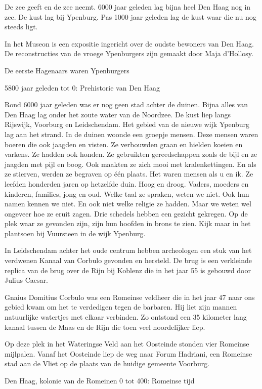 \documentclass[
  a4paper,
]{book}
\theoremstyle{definition}
\theoremstyle{definition}
\theoremstyle{definition}
\theoremstyle{definition}
\theoremstyle{remark}
\begin{document}
De zee geeft en de zee neemt. 6000 jaar geleden lag bijna heel Den Haag nog in zee. De kust lag bij Ypenburg. Pas 1000 jaar geleden lag de kust waar die nu nog steeds ligt.

In het Museon is een expositie ingericht over de oudste bewoners van Den Haag. De reconstructies van de vroege Ypenburgers zijn gemaakt door Maja d'Hollosy.

De eerste Hagenaars waren Ypenburgers

5800 jaar geleden tot 0: Prehistorie van Den Haag

Rond 6000 jaar geleden was er nog geen stad achter de duinen.
Bijna alles van Den Haag lag onder het zoute water van de Noordzee.
De kust liep langs Rijswijk, Voorburg en Leidschendam.
Het gebied van de nieuwe wijk Ypenburg lag aan het strand.
In de duinen woonde een groepje mensen.
Deze mensen waren boeren die ook jaagden en visten.
Ze verbouwden graan en hielden koeien en varkens.
Ze hadden ook honden.
Ze gebruikten gereedschappen zoals de bijl en ze jaagden met pijl en boog.
Ook maakten ze zich mooi met kralenkettingen.
En als ze stierven, werden ze begraven op één plaats.
Het waren mensen als u en ik.
Ze leefden honderden jaren op hetzelfde duin. Hoog en droog.
Vaders, moeders en kinderen, families, jong en oud.
Welke taal ze spraken, weten we niet.
Ook hun namen kennen we niet.
En ook niet welke religie ze hadden.
Maar we weten wel ongeveer hoe ze eruit zagen.
Drie schedels hebben een gezicht gekregen.
Op de plek waar ze gevonden zijn, zijn hun hoofden in brons te zien.
Kijk maar in het plantsoen bij Vuursteen in de wijk Ypenburg.

In Leidschendam achter het oude centrum hebben archeologen een stuk van het verdwenen Kanaal van Corbulo gevonden en hersteld. De brug is een verkleinde replica van de brug over de Rijn bij Koblenz die in het jaar 55 is gebouwd door Julius Caesar.

Gnaius Domitius Corbulo was een Romeinse veldheer die in het jaar 47 naar ons gebied kwam om het te verdedigen tegen de barbaren. Hij liet zijn mannen natuurlijke watertjes met elkaar verbinden. Zo ontstond een 35 kilometer lang kanaal tussen de Maas en de Rijn die toen veel noordelijker liep.

Op deze plek in het Wateringse Veld aan het Oosteinde stonden vier Romeinse mijlpalen. Vanaf het Oosteinde liep de weg naar Forum Hadriani, een Romeinse stad aan de Vliet op de plaats van de huidige gemeente Voorburg.

Den Haag, kolonie van de Romeinen
0 tot 400: Romeinse tijd
\end{document}
